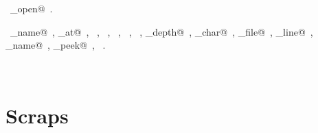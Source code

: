 \documentclass{report}
\begin{document}
\begin{flushleft}
\begin{minipage}{\linewidth}
\begin{list}{}{\setlength{\itemsep}{-\parsep}\setlength{\itemindent}{-\leftmargin}}
\item \NWtxtIdentsDefed\nobreak\  \verb@source_open@\nobreak\ .\end{list}
\vspace{-2ex}
\footnotesize\addtolength{\baselineskip}{-1ex}
\begin{list}{}{\setlength{\itemsep}{-\parsep}\setlength{\itemindent}{-\leftmargin}}
\item \NWtxtIdentsUsed\nobreak\  \verb@command_name@\nobreak\ , \verb@double_at@\nobreak\ , \verb@exit@\nobreak\ , \verb@FALSE@\nobreak\ , \verb@fopen@\nobreak\ , \verb@fprintf@\nobreak\ , \verb@getc@\nobreak\ , \verb@include_depth@\nobreak\ , \verb@nw_char@\nobreak\ , \verb@source_file@\nobreak\ , \verb@source_line@\nobreak\ , \verb@source_name@\nobreak\ , \verb@source_peek@\nobreak\ , \verb@stderr@\nobreak\ .\end{list}
\end{minipage}\\[4ex]
\end{flushleft}
\section{Scraps} \label{scraps}
\end{document}
